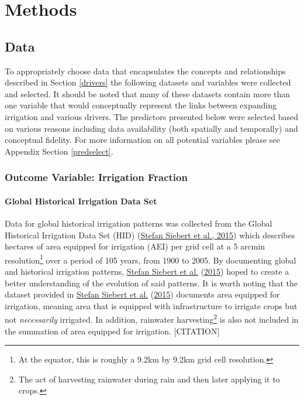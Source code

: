 \documentclass[12pt,twoside]{reedthesis}
\begin{document}
\hypertarget{section}{%
\section{}\label{section}}

\hypertarget{methods}{%
\chapter{Methods}\label{methods}}

\hypertarget{data}{%
\section{Data}\label{data}}

To appropriately choose data that encapsulates the concepts and relationships described in Section \ref{drivers} the following datasets and variables were collected and selected. It should be noted that many of these datasets contain more than one variable that would conceptually represent the links between expanding irrigation and various drivers. The predictors presented below were selected based on various reasons including data availability (both spatially and temporally) and conceptual fidelity. For more information on all potential variables please see Appendix Section \ref{predselect}.

\hypertarget{irrfrac}{%
\subsection{Outcome Variable: Irrigation Fraction}\label{irrfrac}}

\hypertarget{HID}{%
\subsubsection{Global Historical Irrigation Data Set}\label{HID}}

Data for global historical irrigation patterns was collected from the Global Historical Irrigation Data Set (HID) (\protect\hyperlink{ref-siebertGlobalDataSet2015}{Stefan Siebert et al., 2015}) which describes hectares of area equipped for irrigation (AEI) per grid cell at a 5 arcmin resolution\footnote{At the equator, this is roughly a 9.2km by 9.2km grid cell resolution.} over a period of 105 years, from 1900 to 2005. By documenting global and historical irrigation patterns, \protect\hyperlink{ref-siebertGlobalDataSet2015}{Stefan Siebert et al.} (\protect\hyperlink{ref-siebertGlobalDataSet2015}{2015}) hoped to create a better understanding of the evolution of said patterns. It is worth noting that the dataset provided in \protect\hyperlink{ref-siebertGlobalDataSet2015}{Stefan Siebert et al.} (\protect\hyperlink{ref-siebertGlobalDataSet2015}{2015}) documents area equipped for irrigation, meaning area that is equipped with infrastructure to irrigate crops but not \emph{necessarily} irrigated. In addition, rainwater harvesting\footnote{The act of harvesting rainwater during rain and then later applying it to crops.} is also not included in the summation of area equipped for irrigation. {[}CITATION{]}
\end{document}
